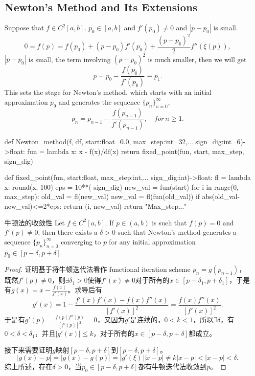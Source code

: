 \subsection{Newton's Method and Its Extensions}
Suppose that $f\in C^2[a,b]$. $p_0\in [a,b]$ and $f'(p_0)\neq 0$ and $\left|p-p_0\right|$ is small.
\[
0 = f(p) = f(p_0)+(p-p_0)f'(p_0)+\frac{(p-p_0)^2}{2}f''(\xi(p)),
\]
$\left|p-p_0\right|$ is small, the term involving $(p-p_0)^2$ is much smaller, then we will get
\[
p \sim p_0 - \frac{f(p_0)}{f'(p_0)}\equiv p_1.
\]
This sets the stage for Newton's method. which starts with an initial approximation $p_0$ and generates the sequence $\{p_n\}_{n=0}^{\infty}$,
\[
p_n = p_{n-1} - \frac{f(p_{n-1})}{f'(p_{n-1})},\quad for\, n\geq 1.
\]
\begin{python}
def Newton_method(f, df, start:float=0.0, max_step:int=32,...
    sign_dig:int=6)->float:
    fun = lambda x: x - f(x)/df(x)
    return fixed_point(fun, start, max_step, sign_dig)

def fixed_point(fun, start:float, max_step:int,...
    sign_dig:int)->float:
    fl = lambda x: round(x, 100)
    eps = 10**(-sign_dig)
    new_val = fun(start)
    for i in range(0, max_step):
        old_val = fl(new_val)
        new_val = fl(fun(old_val))
        if abs(old_val-new_val)<=2*eps:
            return (i, new_val)
    return "Max_step..."
\end{python}
\begin{theo}{牛顿法的收敛性}
Let $f\in C^2[a,b]$. If $p\in (a,b)$ is such that $f(p)=0$ and $f'(p)\neq 0$, then there exists a $\delta>0$ such that Newton's method generates a sequence $\{p_n\}_{n=0}^{\infty}$ converging to $p$ for any initial approximation $p_0\in [p-\delta,p+\delta]$.
\end{theo}
\begin{proof}
证明基于将牛顿迭代法看作 functional iteration scheme $p_n=g(p_{n-1})$，既然$f'(p)\neq 0$，则$\exists\delta_1>0$使得$f'(x)\neq 0$对于所有的$x\in [p-\delta_1,p+\delta_1]$，于是有$g(x)=x-\frac{f(x)}{f'(x)}$。求导后有
\[
g'(x)=1-\frac{f'(x)f'(x)-f(x)f''(x)}{[f'(x)]^2}=\frac{f(x)f''(x)}{[f'(x)]^2}.
\]
于是有$g'(p)=\frac{f(p)f''(p)}{[f'(p)]^2}=0$，又因为$g'$是连续的，$0<k<1$，所以$\exists\delta$，有$0<\delta<\delta_1$，并且$\left|g'(x)\right|\leq k$，对于所有的$x\in [p-\delta,p+\delta]$都成立。\par
接下来需要证明$g$映射$[p-\delta,p+\delta]$到$[p-\delta,p+\delta]$。
\[
\left|g(x)-p\right|=\left|g(x)-g(p)\right|=\left|g'(\xi)\right|\left|x-p\right|\neq k\left|x-p\right|<\left|x-p\right|<\delta.
\]
综上所述，存在$\delta>0$，当$p_0\in [p-\delta,p+\delta]$都有牛顿迭代法收敛到$p$。
\end{proof}

